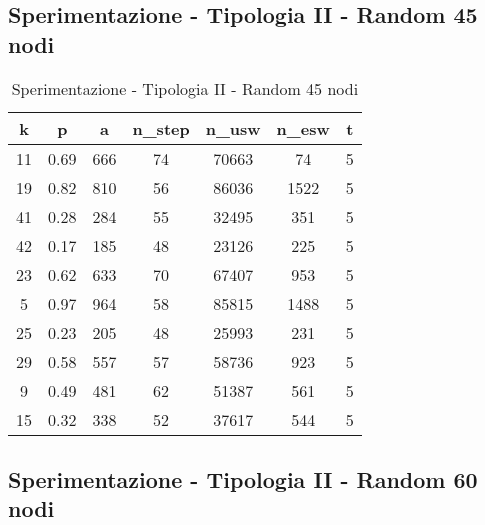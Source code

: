 \subsection{Sperimentazione - Tipologia II - Random 45 nodi}

\begin{table}[H]
\centering
\begin{tabular}{|c|c|c|c|c|c|c|}
\hline
\textbf{k} & \textbf{p} & \textbf{a} & \textbf{n\_step} & \textbf{n\_usw} & \textbf{n\_esw} & \textbf{t} \\ \hline
11 & 0.69 & 666 & 74 & 70663 & 74 & 5 \\ \hline
19 & 0.82 & 810 & 56 & 86036 & 1522 & 5 \\ \hline
41 & 0.28 & 284 & 55 & 32495 & 351 & 5 \\ \hline
42 & 0.17 & 185 & 48 & 23126 & 225 & 5 \\ \hline
23 & 0.62 & 633 & 70 & 67407 & 953 & 5 \\ \hline
5 & 0.97 & 964 & 58 & 85815 & 1488 & 5 \\ \hline
25 & 0.23 & 205 & 48 & 25993 & 231 & 5 \\ \hline
29 & 0.58 & 557 & 57 & 58736 & 923 & 5 \\ \hline
9 & 0.49 & 481 & 62 & 51387 & 561 & 5 \\ \hline
15 & 0.32 & 338 & 52 & 37617 & 544 & 5 \\ \hline
\end{tabular}
\caption{Sperimentazione - Tipologia II - Random 45 nodi}
\label{tab:sperimentazione-tipo1-45nodi}
\end{table}

\subsection{Sperimentazione - Tipologia II - Random 60 nodi}


